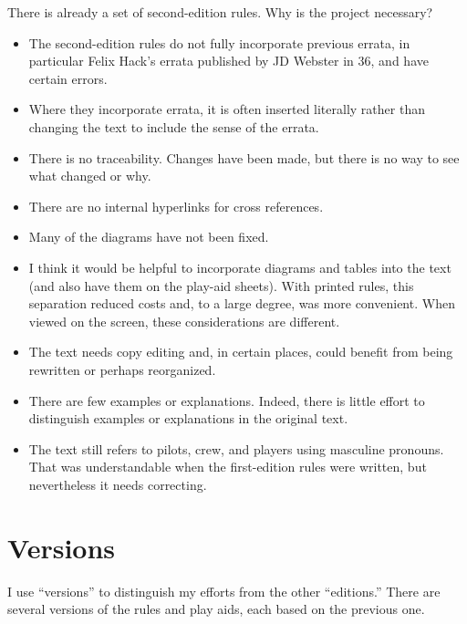 \documentclass[10pt]{report}
\begin{document}
There is already a set of second-edition rules. Why is the project necessary?
\begin{itemize}
    \item The second-edition rules do not fully incorporate previous errata, in particular Felix Hack’s errata published by JD Webster in {\APJ} 36, and have certain errors.
    \item Where they incorporate errata, it is often inserted literally rather than changing the text to include the sense of the errata.
    \item There is no traceability. Changes have been made, but there is no way to see what changed or why.
    \item There are no internal hyperlinks for cross references.
    \item Many of the diagrams have not been fixed.
    \item I think it would be helpful to incorporate diagrams and tables into the text (and also have them on the play-aid sheets). With printed rules, this separation reduced costs and, to a large degree, was more convenient. When viewed on the screen, these considerations are different.
    \item The text needs copy editing and, in certain places, could benefit from being rewritten or perhaps reorganized.
    \item There are few examples or explanations. Indeed, there is little effort to distinguish examples or explanations in the original text.
    \item The text still refers to pilots, crew, and players using masculine pronouns. That was understandable when the first-edition rules were written, but nevertheless it needs correcting.
\end{itemize}

\section{Versions}

I use “versions” to distinguish my efforts from the other “editions.” There are several versions of the rules and play aids, each based on the previous one. 
\end{document}
